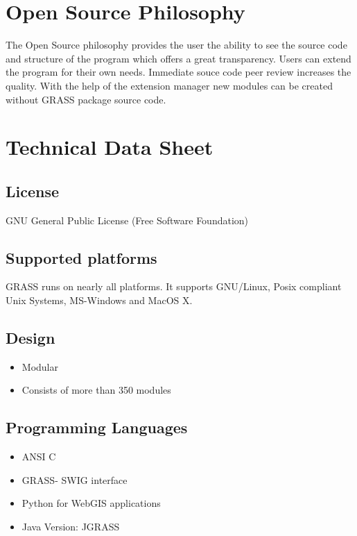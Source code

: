 \documentclass[notumble,a4paper,10pt,nofoldmark]{leaflet}
\begin{document}
\section{Open Source Philosophy}

The Open Source philosophy provides the user the ability to see the source code and structure of the program which offers a great transparency. Users can extend the program for their own needs. Immediate souce code peer review increases the quality. With the help of the extension manager new modules can be created without GRASS package source code.

\section{Technical Data Sheet}

\subsection{License}

GNU General Public License (Free Software Foundation)

\subsection{Supported platforms}

GRASS runs on nearly all platforms. It supports GNU/Linux, Posix compliant Unix Systems, MS-Windows and MacOS X.

\subsection{Design}

\begin{itemize}
\item Modular
\item Consists of more than 350 modules
\end{itemize}

\subsection{Programming Languages}

\begin{itemize}
\item ANSI C
\item GRASS- SWIG interface
\item Python for WebGIS applications
\item Java Version: JGRASS
\end{itemize}
\end{document}
